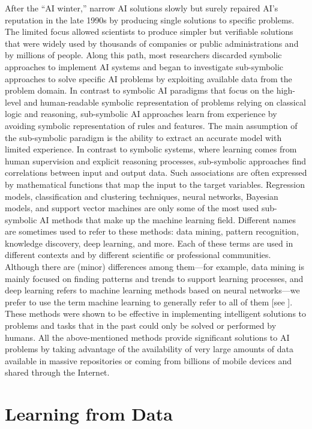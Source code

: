 After the ``AI winter,'' narrow AI solutions slowly but surely repaired AI's reputation in the late 1990s by producing single solutions to specific problems. The limited focus allowed scientists to produce simpler but verifiable solutions that were widely used by thousands of companies or public administrations and by millions of people. Along this path, most researchers discarded symbolic approaches to implement AI systems and began to investigate sub-symbolic approaches to solve specific AI problems by exploiting available data from the problem domain. In contrast to symbolic AI paradigms that focus on the high-level and human-readable symbolic representation of problems relying on classical logic and reasoning, sub-symbolic AI approaches learn from experience by avoiding symbolic representation of rules and features. The main assumption of the sub-symbolic paradigm is the ability to extract an accurate model with limited experience. In contrast to symbolic systems, where learning comes from human supervision and explicit reasoning processes, sub-symbolic approaches find correlations between input and output data. Such associations are often expressed by mathematical functions that map the input to the target variables. Regression models, classification and clustering techniques, neural networks, Bayesian models, and support vector machines are only some of the most used sub-symbolic AI methods that make up the machine learning field. Different names are sometimes used to refer to these methods: data mining, pattern recognition, knowledge discovery, deep learning, and more. Each of these terms are used in different contexts and by different scientific or professional communities. Although there are (minor) differences among them---for example, data mining is mainly focused on finding patterns and trends to support learning processes, and deep learning refers to machine learning methods based on neural networks---we prefer to use the term machine learning to generally refer to all of them [see \citealt{chap:4:Domingos:2017}]. These methods were shown to be effective in implementing intelligent solutions to problems and tasks that in the past could only be solved or performed by humans. All the above-mentioned methods provide significant solutions to AI problems by taking advantage of the availability of very large amounts of data available in massive repositories or coming from billions of mobile devices and shared through the Internet.

\section{\label{sec:4.3}Learning from Data}

